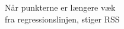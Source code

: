 \documentclass[preview]{standalone}
\begin{document}
\begin{center}
Når punkterne er længere væk \\ fra regressionslinjen, stiger RSS
\end{center}
\end{document}
